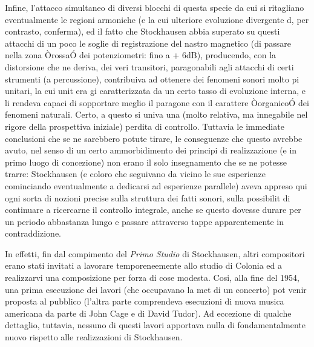 Infine, l'attacco simultaneo di diversi blocchi di questa specie da cui si ritagliano eventualmente le regioni armoniche (e la cui ulteriore evoluzione divergente d, per contrasto, conferma), ed il fatto che Stockhausen abbia superato su questi attacchi di un poco le soglie di registrazione del nastro magnetico (di passare nella zona ÒrossaÓ dei potenziometri: fino a + 6dB), producendo, con la distorsione che ne deriva, dei veri transitori, paragonabili agli attacchi di certi strumenti (a percussione), contribuiva ad ottenere dei fenomeni sonori molto pi unitari, la cui unit era gi caratterizzata da un certo tasso di evoluzione interna, e li rendeva capaci di sopportare meglio il paragone con il carattere ÒorganicoÓ dei fenomeni naturali. Certo, a questo si univa una (molto relativa, ma innegabile nel rigore della prospettiva iniziale) perdita di controllo. Tuttavia le immediate conclusioni che se ne sarebbero potute tirare, le conseguenze che questo 
avrebbe avuto, nel senso di un certo ammorbidimento dei principi di realizzazione (e in primo luogo di concezione) non erano il solo insegnamento che se ne potesse trarre: Stockhausen (e coloro che seguivano da vicino le sue esperienze cominciando eventualmente a dedicarsi ad esperienze parallele) aveva appreso qui ogni sorta di nozioni precise sulla struttura dei fatti sonori, sulla possibilit di continuare a ricercarne il controllo integrale, anche se questo dovesse durare per un periodo abbastanza lungo e passare attraverso tappe apparentemente in contraddizione. 

In effetti, fin dal compimento del \textit{Primo Studio} di Stockhausen, altri compositori erano stati invitati a lavorare temporeneemente allo studio di Colonia ed a realizzarvi una composizione per forza di cose modesta. Cosi, alla fine del 1954, una prima esecuzione dei lavori (che occupavano la met di un concerto) pot venir proposta al pubblico (l'altra parte comprendeva esecuzioni di nuova musica americana da parte di John Cage e di David Tudor). Ad eccezione di qualche dettaglio, tuttavia, nessuno di questi lavori apportava nulla di fondamentalmente nuovo rispetto alle realizzazioni di Stockhausen.

